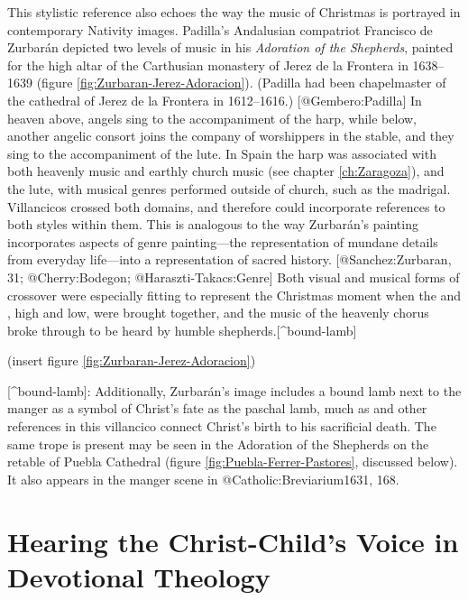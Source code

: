 This stylistic reference also echoes the way the music of Christmas is portrayed
in contemporary Nativity images.
Padilla's Andalusian compatriot Francisco de Zurbarán depicted two levels of
music in his \emph{Adoration of the Shepherds}, painted for the high altar of the
Carthusian monastery of Jerez de la Frontera in 1638--1639
(figure \ref{fig:Zurbaran-Jerez-Adoracion}).
(Padilla had been chapelmaster of the cathedral of Jerez de la Frontera in
1612--1616.)
[@Gembero:Padilla]
In heaven above, angels sing to the accompaniment of the harp, while below,
another angelic consort joins the company of worshippers in the stable, and they
sing to the accompaniment of the lute.
In Spain the harp was associated with both heavenly music and earthly church
music (see chapter \ref{ch:Zaragoza}), and the lute, with musical genres
performed outside of church, such as the madrigal.
Villancicos crossed both domains, and therefore could incorporate references to
both styles within them.
This is analogous to the way Zurbarán's painting incorporates aspects of genre
painting---the representation of mundane details from everyday life---into a
representation of sacred history.
[@Sanchez:Zurbaran, 31; @Cherry:Bodegon; @Haraszti-Takacs:Genre]
Both visual and musical forms of crossover were especially fitting to represent
the Christmas moment when the  and , high and low, were brought
together, and the music of the heavenly chorus broke through to be heard by
humble shepherds.[^bound-lamb]

(insert figure \ref{fig:Zurbaran-Jerez-Adoracion})
\label{fig:Zurbaran-Jerez-Adoracion}

[^bound-lamb]:
Additionally, Zurbarán's image includes a bound lamb next to the manger as a
symbol of Christ's fate as the paschal lamb, much as  and
other references in this villancico connect Christ's birth to his sacrificial
death.
The same trope is present may be seen in the Adoration of the Shepherds on the
retable of Puebla Cathedral (figure \ref{fig:Puebla-Ferrer-Pastores}, discussed
below).
It also appears in the manger scene in @Catholic:Breviarium1631, 168.


\section{Hearing the Christ-Child's Voice in Devotional Theology }

